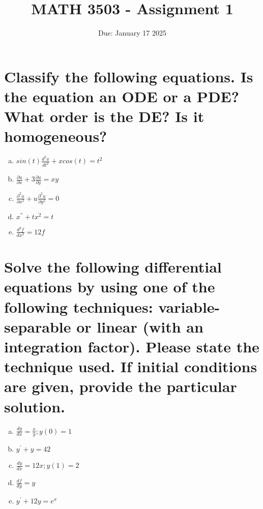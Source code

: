 \documentclass{article}
\title{MATH 3503 - Assignment 1}
\date{Due: January 17 2025}
\begin{document}
\maketitle

\section{Classify the following equations. Is the equation an ODE or a PDE? What order is the DE? Is it homogeneous?}
\begin{enumerate}[a)]
    \item $sin(t) \frac{d^2 x}{dt^2} + x cos(t) = t^2$
    \item $\frac{\partial{u}}{\partial{x}} + 3 \frac{\partial{u}}{\partial{y}} = xy$
    \item $\frac{\partial^2{u}}{\partial{x}^2} + u \frac{\partial^2{u}}{\partial{y}^2} = 0$
    \item $x^{''} + t x^2 = t$
    \item $\frac{d^3f}{dx^3} = 12f$
\end{enumerate}

\section{Solve the following differential equations by using one of the following techniques: variable-separable or linear (with an integration factor). Please state the technique used. If initial conditions are given, provide the particular solution.}
\begin{enumerate}[a)]
    \item $\frac{dy}{dx} = \frac{x}{y} ; y(0) = 1$
    \item $y^{'} + y = 42$
    \item $\frac{dy}{dx} = 12x ; y(1) = 2$
    \item $\frac{df}{dy} = y$
    \item $y^{'} + 12y = e^x$
\end{enumerate}
\end{document}

